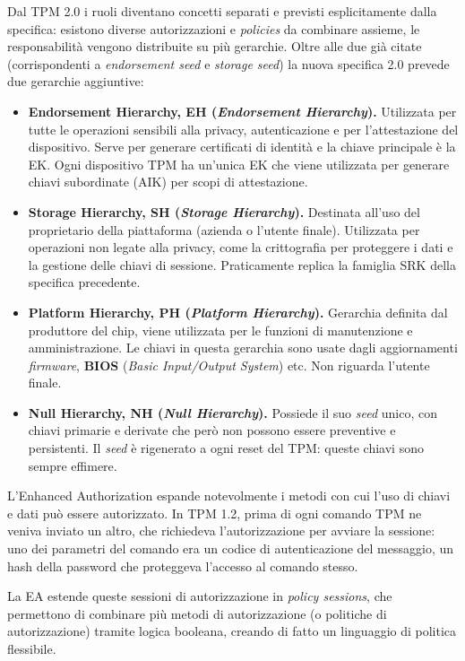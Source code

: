 Dal TPM 2.0 i ruoli diventano concetti separati e previsti esplicitamente dalla specifica: esistono diverse autorizzazioni e \textit{policies} da combinare assieme, le responsabilità vengono distribuite su più gerarchie. Oltre alle due già citate (corrispondenti a \textit{endorsement seed} e \textit{storage seed}) la nuova specifica 2.0 prevede due gerarchie aggiuntive:
\begin{itemize}
    \item \textbf{Endorsement Hierarchy, \textbf{EH} (\textit{Endorsement Hierarchy}).} Utilizzata per tutte le operazioni sensibili alla privacy, autenticazione e per l'attestazione del dispositivo. Serve per generare certificati di identità e la chiave principale è la EK. Ogni dispositivo TPM ha un'unica EK che viene utilizzata per generare chiavi subordinate (AIK) per scopi di attestazione.
    \item \textbf{Storage Hierarchy, \textbf{SH} (\textit{Storage Hierarchy}).} Destinata all'uso del proprietario della piattaforma (azienda o l'utente finale). Utilizzata per operazioni non legate alla privacy, come la crittografia per proteggere i dati e la gestione delle chiavi di sessione. Praticamente replica la famiglia SRK della specifica precedente.
    \item \textbf{Platform Hierarchy, \textbf{PH} (\textit{Platform Hierarchy}).} Gerarchia definita dal produttore del chip, viene utilizzata per le funzioni di manutenzione e amministrazione. Le chiavi in questa gerarchia sono usate dagli aggiornamenti \textit{firmware}, \textbf{BIOS} (\textit{Basic Input/Output System}) etc. Non riguarda l’utente finale.
    \item \textbf{Null Hierarchy, \textbf{NH} (\textit{Null Hierarchy}).} Possiede il suo \textit{seed} unico, con chiavi primarie e derivate che però non possono essere preventive e persistenti. Il \textit{seed} è rigenerato a ogni reset del TPM: queste chiavi sono sempre effimere. 
\end{itemize}

L'Enhanced Authorization espande notevolmente i metodi con cui l'uso di chiavi e dati può essere autorizzato. In TPM 1.2, prima di ogni comando TPM ne veniva inviato un altro, che richiedeva l'autorizzazione per avviare la sessione: uno dei parametri del comando era un codice di autenticazione del messaggio, un hash della password che proteggeva l’accesso al comando stesso.

La EA estende queste sessioni di autorizzazione in \textit{policy sessions}, che permettono di combinare più metodi di autorizzazione (o politiche di autorizzazione) tramite logica booleana, creando di fatto un linguaggio di politica flessibile.  

